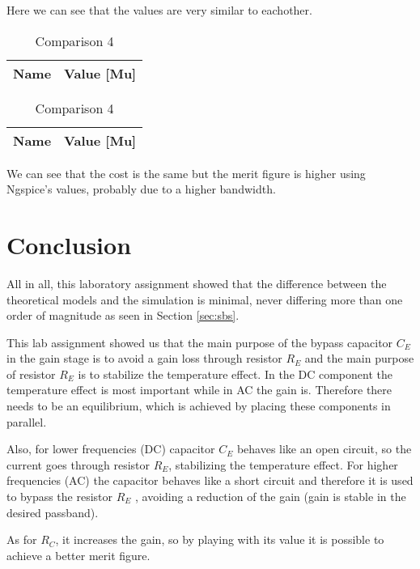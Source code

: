 Here we can see that the values are very similar to eachother.

\begin{table}[h]
\begin{center}
  \begin{tabular}{|c|c|}
    \hline    
    {\bf Name} & {\bf Value [Mu]} \\ \hline
    
    \hline
  \end{tabular}
  \begin{tabular}{|c||c|}
    \hline    
    {\bf Name} & {\bf Value [Mu]} \\ \hline
    
    \hline
  \end{tabular}
  \caption{Comparison 4}
  \label{tab:comparison 4}
\end{center}
\end{table}
\FloatBarrier

We can see that the cost is the same but the merit figure is higher using Ngspice's values, probably due to a higher bandwidth.

\section{Conclusion}
\label{sec:conclusion}

All in all, this laboratory assignment showed that the difference between the theoretical models and the simulation is minimal, never differing more than one order of magnitude as seen in Section \ref{sec:sbs}. \par

This lab assignment showed us that the main purpose of the bypass capacitor $C_E$ in the gain stage is to avoid a gain loss
through resistor $R_E$ and the main purpose of resistor $R_E$ is to stabilize the temperature effect. In the DC component the temperature effect is most important while in AC the gain is. Therefore there needs to be an equilibrium, which is achieved by placing these components in parallel. \par
 
Also, for lower frequencies (DC) capacitor $C_E$ behaves like an open circuit, so the current goes through resistor $R_E$, stabilizing the temperature effect. For higher frequencies (AC) the capacitor behaves like a short circuit and therefore it is used to bypass the resistor $R_E$ , avoiding a reduction of the gain (gain is stable in the desired passband). \par

As for $R_C$, it increases the gain, so by playing with its value it is possible to achieve a better merit figure.




